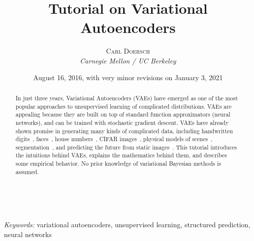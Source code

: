 \documentclass[a4paper, 11pt]{article} %
\title{\textbf{Tutorial on Variational Autoencoders}} %
\author{\textsc{Carl Doersch} %
\\{\textit{Carnegie Mellon / UC Berkeley}}} %
\date{August 16, 2016, with very minor revisions on January 3, 2021}
\makeatletter
\renewcommand{\maketitle}{ %
\begin{center} %
{\LARGE\@title} %

\vspace{50pt} %

{\large\@author} %
\\\@date %

\vspace{40pt} %
\end{center}
}
\makeatother
\begin{document}
\maketitle %



\begin{abstract}
In just three years, Variational Autoencoders (VAEs) have emerged as one of the most popular approaches to unsupervised learning of complicated distributions.  
VAEs are appealing because they are built on top of standard function approximators (neural networks), and can be trained with stochastic gradient descent.
VAEs have already shown promise in generating many kinds of complicated data, including handwritten digits~\cite{Kingma14a, Salimans15}, faces~\cite{Kingma14a,  Rezende14, kulkarni2015deep}, house numbers~\cite{Kingma14b, Gregor15}, CIFAR images~\cite{Gregor15}, physical models of scenes~\cite{kulkarni2015deep}, segmentation~\cite{sohn2015learning}, and predicting the future from static images~\cite{walker2016uncertain}. 
This tutorial introduces the intuitions behind VAEs, explains the mathematics behind them, and describes some empirical behavior.
No prior knowledge of variational Bayesian methods is assumed.  
\end{abstract}

\hspace*{3,6mm}\textit{Keywords:} variational autoencoders, unsupervised learning, structured prediction, neural networks

\vspace{30pt} %

\end{document}
